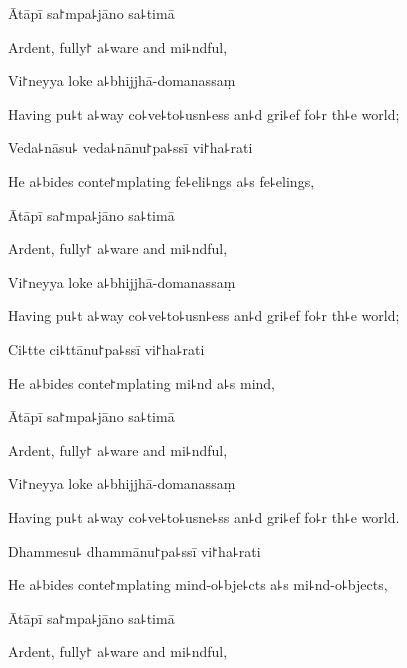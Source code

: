 Ātāpī sa꜓mpa꜕jāno sa꜕timā

\begin{english}
  Ardent, fully꜓ a꜕ware and mi꜕ndful,
\end{english}

Vi꜓neyya loke a꜕bhijjhā-domanassaṃ

\begin{english}
  Having pu꜕t a꜕way co꜕ve꜕to꜕usn꜕ess an꜕d gri꜕ef fo꜕r th꜕e world;
\end{english}

Veda꜕nāsu꜕ veda꜕nānu꜓pa꜕ssī vi꜓ha꜕rati

\begin{english}
  He a꜕bides conte꜓mplating fe꜕eli꜕ngs a꜕s fe꜕elings,
\end{english}

Ātāpī sa꜓mpa꜕jāno sa꜕timā

\begin{english}
  Ardent, fully꜓ a꜕ware and mi꜕ndful,
\end{english}

Vi꜓neyya loke a꜕bhijjhā-domanassaṃ

\begin{english}
  Having pu꜕t a꜕way co꜕ve꜕to꜕usn꜕ess an꜕d gri꜕ef fo꜕r th꜕e world;
\end{english}

Ci꜕tte ci꜕ttānu꜓pa꜕ssī vi꜓ha꜕rati

\begin{english}
  He a꜕bides conte꜓mplating mi꜕nd a꜕s mind,
\end{english}

Ātāpī sa꜓mpa꜕jāno sa꜕timā

\begin{english}
  Ardent, fully꜓ a꜕ware and mi꜕ndful,
\end{english}

Vi꜓neyya loke a꜕bhijjhā-domanassaṃ

\begin{english}
  Having pu꜕t a꜕way co꜕ve꜕to꜕usne꜕ss an꜕d gri꜕ef fo꜕r th꜕e world.
\end{english}

Dhammesu꜕ dhammānu꜓pa꜕ssī vi꜓ha꜕rati

\begin{english}
  He a꜕bides conte꜓mplating mind-o꜕bje꜕cts a꜕s mi꜕nd-o꜕bjects,
\end{english}

Ātāpī sa꜓mpa꜕jāno sa꜕timā

\begin{english}
  Ardent, fully꜓ a꜕ware and mi꜕ndful,
\end{english}

